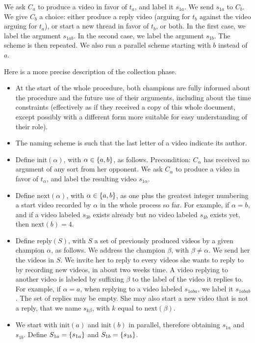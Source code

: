 \documentclass[version=3.21, pagesize, twoside=off, bibliography=totoc, DIV=calc, fontsize=12pt, a4paper]{scrartcl}
\begin{document}
We ask $C_a$ to produce a video in favor of $t_a$, and label it $s_{1a}$. We send $s_{1a}$ to $C_b$. We give $C_b$ a choice: either produce a reply video (arguing for $t_b$ against the video arguing for $t_a$), or start a new thread in favor of $t_b$, or both. In the first case, we label the argument $s_{1ab}$. In the second case, we label the argument $s_{1b}$. The scheme is then repeated. We also run a parallel scheme starting with $b$ instead of $a$.

Here is a more precise description of the collection phase.

\begin{itemize}
	\item At the start of the whole procedure, both champions are fully informed about the procedure and the future use of their arguments, including about the time constraints (effectively as if they received a copy of this whole document, except possibly with a different form more suitable for easy understanding of their role).
	\item The naming scheme is such that the last letter of a video indicate its author.
	\item Define $\text{init}(\alpha)$, with $\alpha \in \{a, b\}$, as follows. Precondition: $C_\alpha$ has received no argument of any sort from her opponent. We ask $C_\alpha$ to produce a video in favor of $t_\alpha$, and label the resulting video $s_{1 \alpha}$.
	\item Define $\text{next}(\alpha)$, with $\alpha \in \{a, b\}$, as one plus the greatest integer numbering a start video recorded by $\alpha$ in the whole process so far. For example, if $\alpha = b$, and if a video labeled $s_{3b}$ exists already but no video labeled $s_{4b}$ exists yet, then $\text{next}(b) = 4$.
	\item Define $\text{reply}(S)$, with $S$ a set of previously produced videos by a given champion $\alpha$, as follows. We address the champion $\beta$, with $\beta ≠ \alpha$. We send her the videos in $S$. We invite her to reply to every videos she wants to reply to by recording new videos, in about two weeks time. A video replying to another video is labeled by suffixing $\beta$ to the label of the video it replies to. For example, if $\alpha = a$, when replying to a video labeled $s_{1aba}$, we label it $s_{1abab}$. The set of replies may be empty. She may also start a new video that is not a reply, that we name $s_{k\beta}$, with $k$ equal to $\text{next}(\beta)$.
	\item We start with $\text{init}(a)$ and $\text{init}(b)$ in parallel, therefore obtaining $s_{1a}$ and $s_{1b}$. Define $S_{1a} = \{s_{1a}\}$ and $S_{1b} = \{s_{1b}\}$.

\end{itemize}
\end{document}
